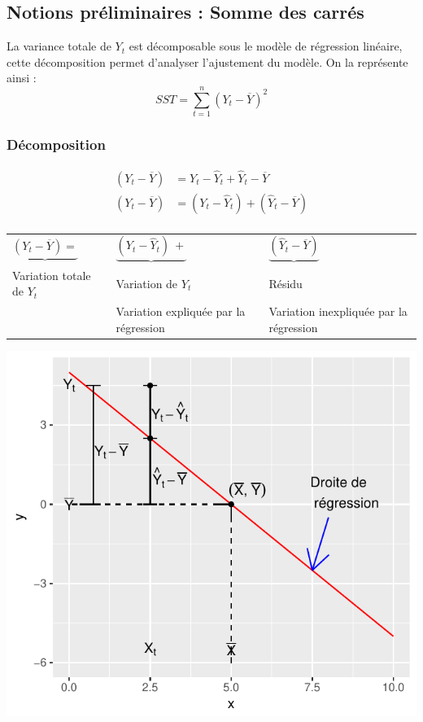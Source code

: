 \documentclass[11pt,french]{report}
\begin{document}
\subsection{Notions préliminaires : Somme des carrés}
La variance totale de $Y_t$ est décomposable sous le modèle de régression linéaire, cette décomposition permet d'analyser l'ajustement du modèle. On la représente ainsi :
$$
SST = \displaystyle\sum_{t=1}^n(Y_t-\overline{Y})^2
$$
\bigskip
\subsubsection*{Décomposition}
\begin{align*}
(Y_t - \overline{Y}) &= Y_t - \hat{Y}_t + \hat{Y}_t - \overline{Y} \\
(Y_t - \overline{Y}) &= (Y_t - \hat{Y}_t) + (\hat{Y}_t - \overline{Y}) \\
\end{align*}

\begin{center}
\begin{tabularx}{\textwidth}{XXX}
$\underbrace{(Y_t - \overline{Y}) =} $ & $\underbrace{(Y_t - \hat{Y}_t) \  +}$ & $\underbrace{(\hat{Y}_t - \overline{Y})}$ \\
Variation totale de $Y_t$ & Variation de $Y_t$ & Résidu \\
& Variation expliquée \newline par la régression & Variation inexpliquée \newline par la régression \\
\end{tabularx}
\end{center}

\includegraphics{notes_de_cours-014}
\end{document}
